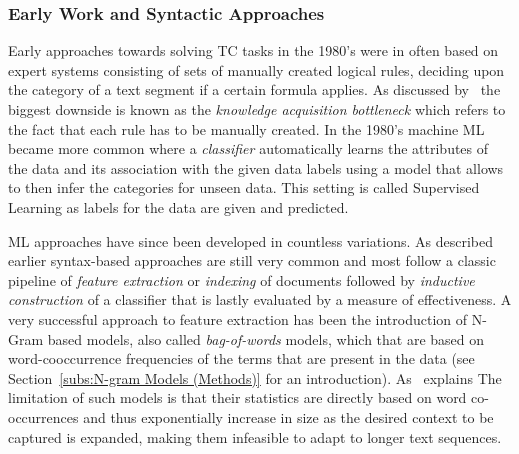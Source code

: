 \subsubsection*{Early Work and Syntactic Approaches}
\label{subs:Early Work and Syntactic Approaches}

Early approaches towards solving \acrlong{TC} tasks in the 1980's were in often based on expert systems consisting of sets of manually created logical rules, deciding upon the category of a text segment if a certain formula applies. As discussed by~\cite{Sebastiani:2002aa} the biggest downside is known as the \emph{knowledge acquisition bottleneck} which refers to the fact that each rule has to be manually created. In the 1980's machine \acrfull{ML} became more common where a \emph{classifier} automatically learns the attributes of the data and its association with the given data labels using a model that allows to then infer the categories for unseen data. This setting is called \gls{Supervised Learning} as labels for the data are given and predicted.

\acrshort{ML} approaches have since been developed in countless variations. As described earlier syntax-based approaches are still very common and most follow a classic pipeline of \emph{feature extraction} or \emph{indexing} of documents followed by \emph{inductive construction} of a classifier that is lastly evaluated by a measure of effectiveness. A very successful approach to feature extraction has been the introduction of N-Gram based models, also called \emph{bag-of-words} models, which that are based on word-cooccurrence frequencies of the terms that are present in the data (see Section~\ref{subs:N-gram Models (Methods)} for an introduction).
As~\cite{Mikolov:2012aa} explains 
The limitation of such models is that their statistics are directly based on word co-occurrences and thus exponentially increase in size as the desired context to be captured is expanded, making them infeasible to adapt to longer text sequences.

